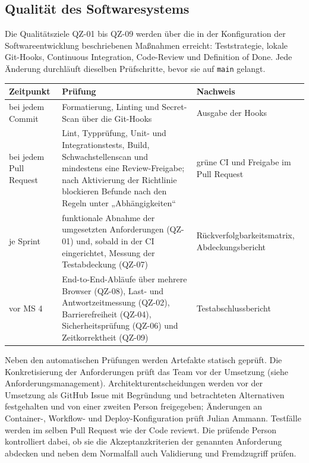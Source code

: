 \documentclass[11pt,a4paper]{article}
\begin{document}
\subsection{Qualität des Softwaresystems}

Die Qualitätsziele QZ-01 bis QZ-09 werden über die in der Konfiguration der Softwareentwicklung beschriebenen Maßnahmen erreicht: Teststrategie, lokale Git-Hooks, Continuous Integration, Code-Review und Definition of Done. Jede Änderung durchläuft dieselben Prüfschritte, bevor sie auf \texttt{main} gelangt.

\begin{tabularx}{\linewidth}{@{}>{\hsize=0.56\hsize\RaggedRight\arraybackslash}X >{\hsize=1.65\hsize\RaggedRight\arraybackslash}X >{\hsize=0.79\hsize\RaggedRight\arraybackslash}X@{}}
\toprule
\textbf{Zeitpunkt} & \textbf{Prüfung} & \textbf{Nachweis} \\
\midrule
\endhead
bei jedem Commit & Formatierung, Linting und Secret-Scan über die Git-Hooks & Ausgabe der Hooks \\
bei jedem Pull Request & Lint, Typprüfung, Unit- und Integrationstests, Build, Schwachstellenscan und mindestens eine Review-Freigabe; nach Aktivierung der Richtlinie blockieren Befunde nach den Regeln unter „Abhängigkeiten“ & grüne CI und Freigabe im Pull Request \\
je Sprint & funktionale Abnahme der umgesetzten Anforderungen (QZ-01) und, sobald in der CI eingerichtet, Messung der Testabdeckung (QZ-07) & Rückverfolgbarkeitsmatrix, Abdeckungsbericht \\
vor MS 4 & End-to-End-Abläufe über mehrere Browser (QZ-08), Last- und Antwortzeitmessung (QZ-02), Barrierefreiheit (QZ-04), Sicherheitsprüfung (QZ-06) und Zeitkorrektheit (QZ-09) & Testabschlussbericht \\
\bottomrule
\end{tabularx}

Neben den automatischen Prüfungen werden Artefakte statisch geprüft. Die Konkretisierung der Anforderungen prüft das Team vor der Umsetzung (siehe Anforderungsmanagement). Architekturentscheidungen werden vor der Umsetzung als GitHub Issue mit Begründung und betrachteten Alternativen festgehalten und von einer zweiten Person freigegeben; Änderungen an Container-, Workflow- und Deploy-Konfiguration prüft Julian Ammann. Testfälle werden im selben Pull Request wie der Code reviewt. Die prüfende Person kontrolliert dabei, ob sie die Akzeptanzkriterien der genannten Anforderung abdecken und neben dem Normalfall auch Validierung und Fremdzugriff prüfen.
\end{document}
